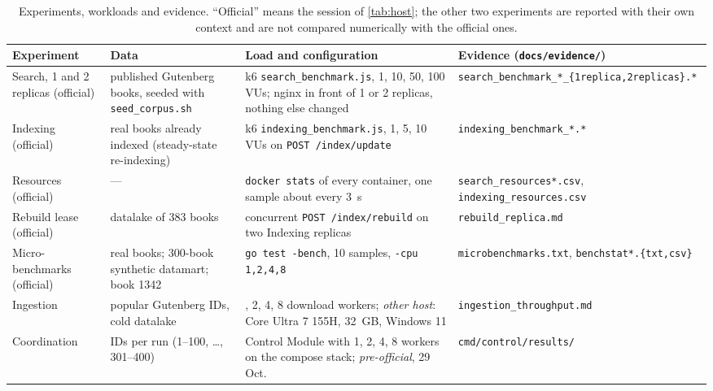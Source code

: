 \documentclass[10pt,a4paper]{article}
\newcommand{\code}[1]{\texttt{#1}}
\newcommand{\route}[1]{\texttt{#1}}
\begin{document}
\begin{table}[htbp]
  \centering
  \footnotesize
  \caption{Experiments, workloads and evidence. ``Official'' means the session
  of \cref{tab:host}; the other two experiments are reported with their own
  context and are not compared numerically with the official ones.}
  \label{tab:workloads}
  \begin{tabularx}{\textwidth}{@{}>{\raggedright\arraybackslash}p{2.3cm}>{\raggedright\arraybackslash}p{3.0cm}>{\raggedright\arraybackslash}X>{\raggedright\arraybackslash}p{4.0cm}@{}}
    \toprule
    Experiment & Data & Load and configuration & Evidence (\code{docs/evidence/\allowbreak }) \\
    \midrule
    Search, 1 and 2 replicas (official) & 300 published Gutenberg books,
      seeded with \code{seed\_corpus.sh} & k6 \code{search\_benchmark.js}, 1, 10,
      50, 100 VUs; nginx in front of 1 or 2 replicas, nothing else changed &
      \code{search\_benchmark\_*\_\allowbreak\{1replica,\allowbreak 2replicas\}.*} \\
    Indexing (official) & 20 real books already indexed (steady-state
      re-indexing) & k6 \code{indexing\_benchmark.js}, 1, 5, 10 VUs on
      \route{POST /index/update} & \code{indexing\_benchmark\_*.*} \\
    Resources (official) & --- & \code{docker stats} of every container, one
      sample about every 3~s & \code{search\_resources*.csv},
      \code{indexing\_resources.csv} \\
    Rebuild lease (official) & datalake of 383 books & concurrent
      \route{POST /index/rebuild} on two Indexing replicas & \code{rebuild\_replica.md} \\
    Micro-benchmarks (official) & 383 real books; 300-book synthetic datamart;
      book 1342 & \code{go test -bench}, 10 samples, \code{-cpu 1,2,4,8} &
      \code{microbenchmarks.txt}, \code{benchstat*.\{txt,csv\}} \\
    Ingestion & 100 popular Gutenberg IDs, cold datalake & 1, 2, 4, 8 download
      workers; \emph{other host}: Core Ultra 7 155H, 32~GB, Windows 11 &
      \code{ingestion\_throughput.md} \\
    Coordination & 100 IDs per run (1--100, \ldots, 301--400) & Control Module
      with 1, 2, 4, 8 workers on the compose stack; \emph{pre-official}, 29 Oct. &
      \code{cmd/control/results/} \\
    \bottomrule
  \end{tabularx}
\end{table}
\end{document}
